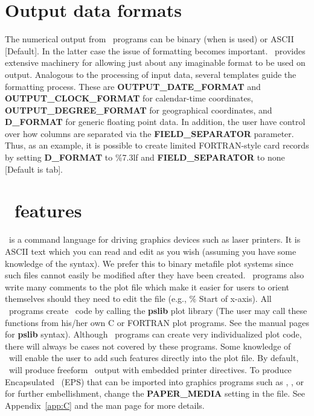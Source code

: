 \section{Output data formats}
\label{sec:output data}

The numerical output from \GMT\ programs can be binary (when  is used) or ASCII [Default].
In the latter case the issue of formatting becomes important.  \GMT\ provides extensive
machinery for allowing just about any imaginable format to be used on output.  Analogous to
the processing of input data, several templates guide the formatting process.  These are
\textbf{OUTPUT\_DATE\_FORMAT} and \textbf{OUTPUT\_CLOCK\_FORMAT} for calendar-time coordinates,
\textbf{OUTPUT\_DEGREE\_FORMAT} for geographical coordinates, and \textbf{D\_FORMAT} for generic
floating point data.  In addition, the user have control over how columns are separated via
the \textbf{FIELD\_SEPARATOR} parameter.  Thus, as an example, it is possible to create limited
FORTRAN-style card records by setting \textbf{D\_FORMAT} to \%7.3lf and \textbf{FIELD\_SEPARATOR} to
none [Default is tab].

\section{\PS\ features}
\PS\ is a command language for driving graphics
devices such as laser printers.  It is ASCII text which you
can read and edit as you wish (assuming you have some knowledge
of the syntax).  We prefer this to binary metafile plot
systems since such files cannot easily be modified after they
have been created.  \GMT\ programs also write many comments to
the plot file which make it easier for users to orient
themselves should they need to edit the file (e.g., \% Start
of x-axis).  All \GMT\ programs create \PS\ code by
calling the \textbf{pslib} plot library (The user may call these
functions from his/her own C or FORTRAN plot programs. See the
manual pages for \textbf{pslib} syntax).  Although \GMT\ programs
can create very individualized plot code, there will always be
cases not covered by these programs.  Some knowledge of
\PS\ will enable the user to add such features
directly into the plot file.  By default, \GMT\ will produce
freeform \PS\ output with embedded printer directives.  To
produce Encapsulated \PS\ (EPS) that can be imported into graphics programs such as
, ,  or  for further
embellishment, change the \textbf{PAPER\_MEDIA} setting in the 
file.  See Appendix~\ref{app:C} and the  man page for more details.

